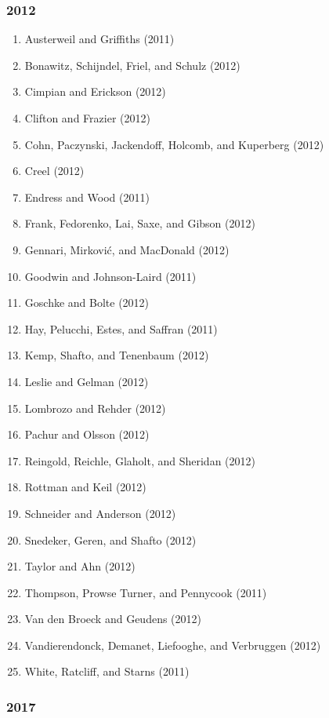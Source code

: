 \documentclass[english,man]{apa6}
\providecommand{\tightlist}{%
  \setlength{\itemsep}{0pt}\setlength{\parskip}{0pt}}
\begin{document}
\subsubsection{2012}\label{section-4}

\begin{enumerate}
\def\labelenumi{\arabic{enumi})}
\tightlist
\item
  Austerweil and Griffiths (2011)
\item
  Bonawitz, Schijndel, Friel, and Schulz (2012)
\item
  Cimpian and Erickson (2012)
\item
  Clifton and Frazier (2012)
\item
  Cohn, Paczynski, Jackendoff, Holcomb, and Kuperberg (2012)
\item
  Creel (2012)
\item
  Endress and Wood (2011)
\item
  Frank, Fedorenko, Lai, Saxe, and Gibson (2012)
\item
  Gennari, Mirković, and MacDonald (2012)
\item
  Goodwin and Johnson-Laird (2011)
\item
  Goschke and Bolte (2012)
\item
  Hay, Pelucchi, Estes, and Saffran (2011)
\item
  Kemp, Shafto, and Tenenbaum (2012)
\item
  Leslie and Gelman (2012)
\item
  Lombrozo and Rehder (2012)
\item
  Pachur and Olsson (2012)
\item
  Reingold, Reichle, Glaholt, and Sheridan (2012)
\item
  Rottman and Keil (2012)
\item
  Schneider and Anderson (2012)
\item
  Snedeker, Geren, and Shafto (2012)
\item
  Taylor and Ahn (2012)
\item
  Thompson, Prowse Turner, and Pennycook (2011)
\item
  Van den Broeck and Geudens (2012)
\item
  Vandierendonck, Demanet, Liefooghe, and Verbruggen (2012)
\item
  White, Ratcliff, and Starns (2011)
\end{enumerate}

\subsubsection{2017}\label{section-5}
\end{document}
